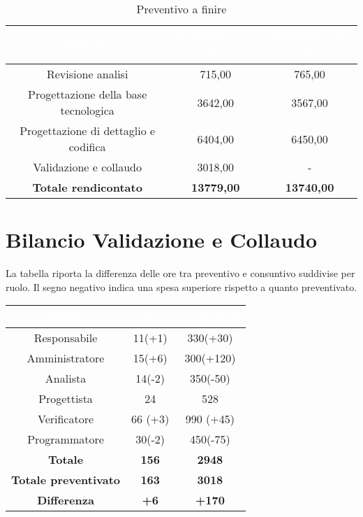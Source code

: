 \begin{flushleft}
		\begin{table}[H]
		\begin{center}
			
			
			\begin{tabular}{ccc}
				
				\rowcolor{coolblack}
				\hline
				\textcolor{white}{Periodo} & \textcolor{white}{Preventivo in \euro} & \textcolor{white}{Consuntivo in \euro}\\
				\hline
				Revisione analisi& 715,00 & 765,00 \\ 	
				Progettazione della base tecnologica& 3642,00 & 3567,00\\ 
				Progettazione di dettaglio e codifica& 6404,00   & 6450,00\\ 
				Validazione e collaudo & 3018,00 & - \\ \hline
				\textbf{Totale rendicontato}& \textbf{13779,00} & \textbf{13740,00}	\\ \hline   
				
			\end{tabular}
			\caption{Preventivo a finire} 
		\end{center}		
	\end{table}
\newpage

	\section{Bilancio Validazione e Collaudo}\label{BilVC}
La tabella riporta la differenza delle ore tra preventivo e consuntivo suddivise per ruolo. Il segno negativo indica una spesa superiore rispetto a quanto preventivato.\\
		\begin{table}[H]
		\begin{center}
			\begin{tabular}{ccc}
				\rowcolor{coolblack}
				\hline
				\textcolor{white}{Ruolo} & \textcolor{white}{Ore} & \textcolor{white}{Costo in \euro}\\
				\hline
				Responsabile   & 11(+1)	&  	330(+30)	\\ 
				Amministratore & 15(+6)	&  	300(+120)	\\ 
				Analista       & 14(-2) &   350(-50)\\ 
				Progettista    & 24 & 528   \\ 
				Verificatore   & 66	(+3)&  	990 (+45) 	\\ 
				Programmatore  & 30(-2)&   	450(-75)\\ \hline
				\textbf{Totale}& \textbf{156} & \textbf{2948}	\\ \hline 
				\textbf{Totale preventivato}& \textbf{163} & \textbf{3018}\\ \hline 
				\textbf{Differenza}& \textbf{+6} & \textbf{+170}	\\ \hline  
			\end{tabular}
			

\end{center}
\end{table}
\end{flushleft}
